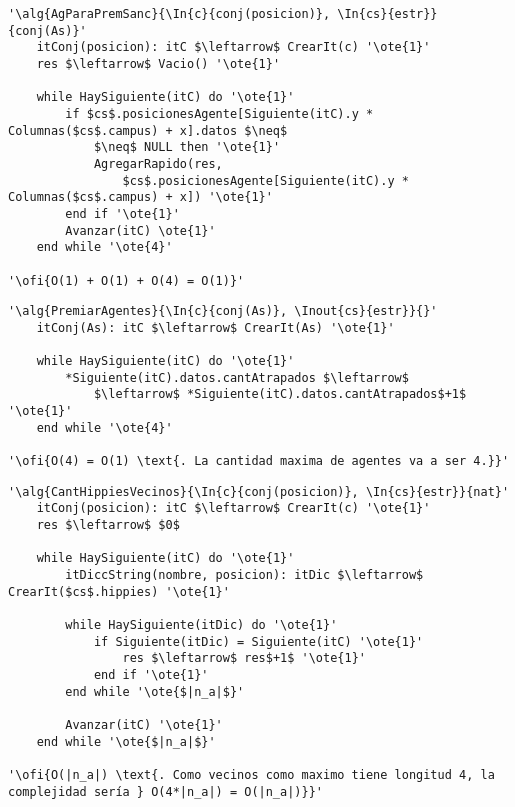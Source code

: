 \begin{lstlisting}[mathescape]
'\alg{AgParaPremSanc}{\In{c}{conj(posicion)}, \In{cs}{estr}}{conj(As)}'
	itConj(posicion): itC $\leftarrow$ CrearIt(c) '\ote{1}'
	res $\leftarrow$ Vacio() '\ote{1}'

	while HaySiguiente(itC) do '\ote{1}'
		if $cs$.posicionesAgente[Siguiente(itC).y * Columnas($cs$.campus) + x].datos $\neq$ 
			$\neq$ NULL then '\ote{1}'
			AgregarRapido(res, 
				$cs$.posicionesAgente[Siguiente(itC).y * Columnas($cs$.campus) + x]) '\ote{1}'
		end if '\ote{1}'
		Avanzar(itC) \ote{1}'
	end while '\ote{4}'

'\ofi{O(1) + O(1) + O(4) = O(1)}'
\end{lstlisting}

\begin{lstlisting}[mathescape]
'\alg{PremiarAgentes}{\In{c}{conj(As)}, \Inout{cs}{estr}}{}'
	itConj(As): itC $\leftarrow$ CrearIt(As) '\ote{1}'
	
	while HaySiguiente(itC) do '\ote{1}'
		*Siguiente(itC).datos.cantAtrapados $\leftarrow$
			$\leftarrow$ *Siguiente(itC).datos.cantAtrapados$+1$ '\ote{1}'
	end while '\ote{4}'

'\ofi{O(4) = O(1) \text{. La cantidad maxima de agentes va a ser 4.}}'
\end{lstlisting}

\begin{lstlisting}[mathescape]
'\alg{CantHippiesVecinos}{\In{c}{conj(posicion)}, \In{cs}{estr}}{nat}'
	itConj(posicion): itC $\leftarrow$ CrearIt(c) '\ote{1}'
	res $\leftarrow$ $0$
	
	while HaySiguiente(itC) do '\ote{1}'
		itDiccString(nombre, posicion): itDic $\leftarrow$ CrearIt($cs$.hippies) '\ote{1}'
		
		while HaySiguiente(itDic) do '\ote{1}'
			if Siguiente(itDic) = Siguiente(itC) '\ote{1}'
				res $\leftarrow$ res$+1$ '\ote{1}'
			end if '\ote{1}'
		end while '\ote{$|n_a|$}'

		Avanzar(itC) '\ote{1}'
	end while '\ote{$|n_a|$}'

'\ofi{O(|n_a|) \text{. Como vecinos como maximo tiene longitud 4, la complejidad sería } O(4*|n_a|) = O(|n_a|)}}'
\end{lstlisting}

